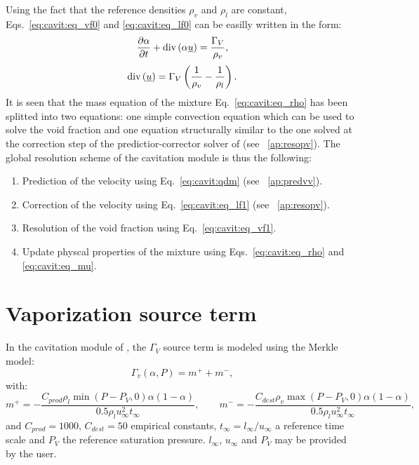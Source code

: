 Using the fact that the reference densities $\rho_v$ and $\rho_l$ are
constant, Eqs.~\eqref{eq:cavit:eq_vf0} and \eqref{eq:cavit:eq_lf0} can be easilly
written in the form:
\begin{equation}
\label{eq:cavit:eq_vf1}
\dfrac{\partial \alpha}{\partial t} + \text{div}\,(\alpha\underline{u}) =
\dfrac{\Gamma_V}{\rho_v},
\end{equation}
%
\begin{equation}
\label{eq:cavit:eq_lf1}
\text{div}\,(\underline{u})=\Gamma_V\left(\frac{1}{\rho_v}-\frac{1}{\rho_l}\right).
\end{equation}
It is seen that the mass equation of the mixture Eq.~\eqref{eq:cavit:eq_rho}
has been splitted into two equations: one simple convection equation
which can be used to solve the void fraction and one equation
structurally similar to the one solved at the correction step of the
predictior-corrector solver of \CS (see \appendixname~\ref{ap:resopv}).
The global resolution scheme of the cavitation module is thus the
following:
\begin{enumerate}
\item Prediction of the velocity using Eq.~\eqref{eq:cavit:qdm} (see
\appendixname~\ref{ap:predvv}).
\item Correction of the velocity using Eq.~\eqref{eq:cavit:eq_lf1} (see
\appendixname~\ref{ap:resopv}).
\item Resolution of the void fraction using Eq.~\eqref{eq:cavit:eq_vf1}.
\item Update physcal properties of the mixture using
Eqs.~\eqref{eq:cavit:eq_rho} and \eqref{eq:cavit:eq_mu}.
\end{enumerate}
%
\section{Vaporization source term}
\label{sec:cavit:source_term}
In the cavitation module of \CS, the $\Gamma_V$ source term is
modeled using the Merkle model:
\begin{equation*}
\Gamma_v \left(\alpha, P\right) = m^+ + m^-,
\end{equation*}
 with:
\begin{equation}
m^+ = -\dfrac{C_{prod} \rho_l \min \left( P-P_V,0
\right)\alpha(1-\alpha)}{0.5\rho_lu_\infty^2t_\infty},\qquad
m^- = -\dfrac{C_{dest} \rho_v \max \left( P-P_V,0
\right)\alpha(1-\alpha)}{0.5\rho_lu_\infty^2t_\infty},
\end{equation}
and
$ C_{prod} = 1000, \, C_{dest} = 50 $
empirical constants, $t_\infty=l_\infty/u_\infty$ a reference time
scale and $P_V$ the reference saturation pressure. $l_\infty$,
$u_\infty$ and $P_V$ may be provided by the user.
%
